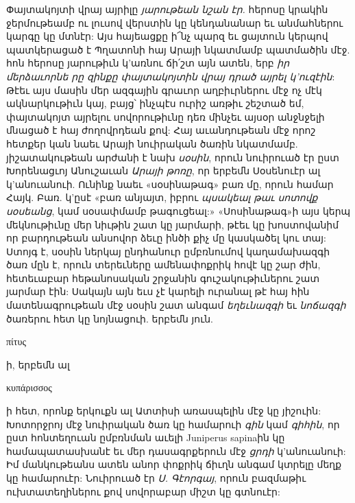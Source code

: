 \documentclass{article}
\begin{document}
{Փայտակոյտի վրայ այրիլը \emph{յարութեան նշան էր.} հերոսը կրակին ջերմութեամբ ու լուսով վերստին կը կենդանանար եւ անմահներու կարգը կը մտնէր: Այս հայեացքը ի՜նչ պարզ եւ ցայտուն կերպով պատկերացած է Պղատոնի հայ Արայի նկատմամբ պատմածին մէջ. հոն հերոսը յարութիւն կ'առնու ճի՛շտ այն ատեն, երբ \emph{իր մերձաւորնե րը զինքը փայտակոյտին վրայ դրած այրել կ'ուզէին}: Թէեւ այս մասին մեր ազգային գրաւոր աղբիւրներու մէջ ոչ մէկ ակնարկութիւն կայ, բայց՝ ինչպէս ուրիշ առթիւ շեշտած եմ, փայտակոյտ այրելու սովորութիւնը դեռ մինչեւ այսօր անջնջելի մնացած է հայ ժողովրդեան քով: Հայ աւանդութեան մէջ որոշ հետքեր կան նաեւ Արայի նուիրական ծառին նկատմամբ. յիշատակութեան արժանի է նախ \emph{սօսին}, որուն նուիրուած էր ըստ Խորենացւոյ Անուշաւան \emph{Արայի թոռը}, որ երբեմն Սօսենուէր ալ կ'անուանուի. Ունինք նաեւ «սօսինաթագ» բառ մը, որուն համար Հայկ. Բառ. կ'ըսէ «բառ անյայտ, իբրու \emph{պսակեալ թաւ սոտովք սօսեանց}, կամ սօսափմամբ թագուցեալ:» «Սոսինաթագ»ի այս կերպ մեկնութիւնը մեր նիւթին շատ կը յարմարի, թէեւ կը խոստովանիմ որ բարդութեան անսովոր ձեւը ինծի քիչ մը կասկածել կու տայ: Ստոյգ է, սօսին ներկայ ընդհանուր ըմբռնումով կաղամախազգի ծառ մըն է, որուն տերեւները ամենափոքրիկ հովէ կը շար ժին, հետեւաբար հեթանոսական շրջանին գուշակութիւներու շատ յարմար էին: Սակայն այն եւս չէ կարելի ուրանալ թէ հայ հին մատենագրութեան մէջ սօսին շատ անգամ \emph{եղեւնազգի} եւ \emph{նոճազգի} ծառերու հետ կը նոյնացուի. երբեմն յուն. \begin{greek}πίτυς\end{greek}ի, երբեմն ալ \begin{greek}κυπάρισσος\end{greek}ի հետ, որոնք երկուքն ալ Ատտիսի առասպելին մէջ կը յիշուին: Խոտորջրոյ մէջ նուիրական ծառ կը համարուի \emph{գին} կամ \emph{գիհին}, որ ըստ հոնտեղուան ըմբռնման աւելի Juniperus sapinaին կը համապատասխանէ եւ մեր դասագրքերուն մէջ \emph{ցրդի} կ'անուանուի: Իմ մանկութեանս ատեն անոր փոքրիկ ճիւղն անգամ կտրելը մեղք կը համարուէր: Նուիրուած էր \emph{Ս. Գէորգայ}, որուն բազմաթիւ ուխտատեղիներու քով սովորաբար միշտ կը գտնուէր:

}
\end{document}
